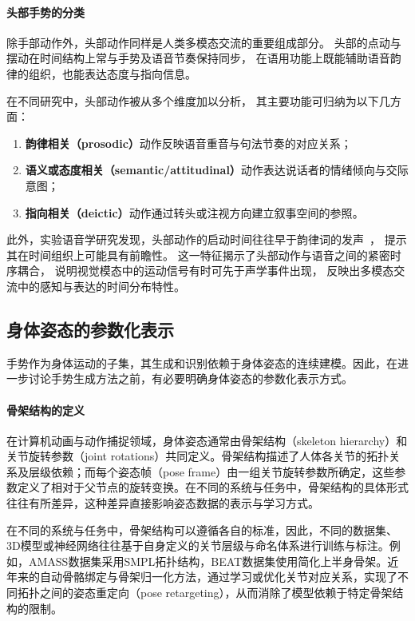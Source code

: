 \paragraph{头部手势的分类}
除手部动作外，头部动作同样是人类多模态交流的重要组成部分。%
头部的点动与摆动在时间结构上常与手势及语音节奏保持同步\cite{gesture_and_speech_in_interaction}，%
在语用功能上既能辅助语音韵律的组织，也能表达态度与指向信息。%

在不同研究中，头部动作被从多个维度加以分析，%
其主要功能可归纳为以下几方面：%
\begin{enumerate}
  \item \textbf{韵律相关（prosodic）}动作反映语音重音与句法节奏的对应关系\cite{hadar_1989_headmovement}；%
  \item \textbf{语义或态度相关（semantic/attitudinal）}动作表达说话者的情绪倾向与交际意图\cite{kendon_2004_gesture,mcneill_1992_hand}；%
  \item \textbf{指向相关（deictic）}动作通过转头或注视方向建立叙事空间的参照\cite{mcneill_1992_hand}。
\end{enumerate}

此外，实验语音学研究发现，头部动作的启动时间往往早于韵律词的发声~\cite{esteve2017timing}，%
提示其在时间组织上可能具有前瞻性。%
这一特征揭示了头部动作与语音之间的紧密时序耦合，%
说明视觉模态中的运动信号有时可先于声学事件出现，%
反映出多模态交流中的感知与表达的时间分布特性。%

\subsection{身体姿态的参数化表示}
手势作为身体运动的子集，其生成和识别依赖于身体姿态的连续建模。因此，在进一步讨论手势生成方法之前，有必要明确身体姿态的参数化表示方式。

\paragraph{骨架结构的定义}
在计算机动画与动作捕捉领域，身体姿态通常由骨架结构（skeleton hierarchy）和关节旋转参数（joint rotations）共同定义。骨架结构描述了人体各关节的拓扑关系及层级依赖；而每个姿态帧（pose frame）由一组关节旋转参数所确定，这些参数定义了相对于父节点的旋转变换。在不同的系统与任务中，骨架结构的具体形式往往有所差异，这种差异直接影响姿态数据的表示与学习方式。

在不同的系统与任务中，骨架结构可以遵循各自的标准，因此，不同的数据集、3D模型或神经网络往往基于自身定义的关节层级与命名体系进行训练与标注。例如，AMASS数据集\cite{AMASS:2019}采用SMPL拓扑结构\cite{SMPL:2015}，BEAT数据集\cite{beatcamn}使用简化上半身骨架。近年来的自动骨骼绑定与骨架归一化方法，通过学习或优化关节对应关系，实现了不同拓扑之间的姿态重定向（pose retargeting）\cite{GleicherRetargetting1998,MartinelliSkeleton-AwareRetargeting2024}，从而消除了模型依赖于特定骨架结构的限制。

